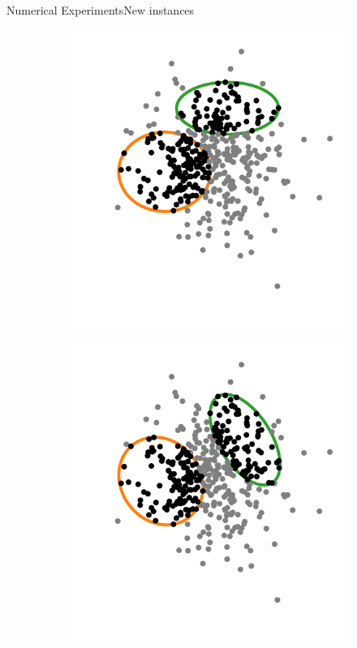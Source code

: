 \documentclass{beamer}
\theoremstyle{definition}
\begin{document}
\begin{frame}{Numerical Experiments}{New instances}
	
	\begin{figure}
		\begin{subfigure}{.44\textwidth}
			\centering
			\includegraphics[scale=.6]{../article/figures/MCE_TA21}
			\caption{}
			\label{fig:MCE_TA21}
		\end{subfigure}
		\begin{subfigure}{.44\textwidth}
			\centering
			\includegraphics[scale=.6]{../article/figures/MCER_TA21}

\end{subfigure}
\end{figure}
\end{frame}
\end{document}
